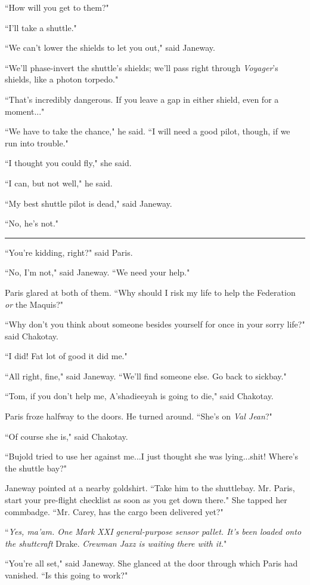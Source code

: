 \documentclass[twoside,letterpaper,12pt]{memoir}
\begin{document}
``How will you get to them?"

``I'll take a shuttle."

``We can't lower the shields to let you out," said Janeway.

``We'll phase-invert the shuttle's shields; we'll pass right through \textit{Voyager}'s shields, like a photon torpedo."

``That's incredibly dangerous. If you leave a gap in either shield, even for a moment..."

``We have to take the chance," he said. ``I will need a good pilot, though, if we run into trouble."

``I thought you could fly," she said.

``I can, but not well," he said.

``My best shuttle pilot is dead," said Janeway.

``No, he's not."

\fancybreak{\rule{3cm}{0.4 pt}}
``You're kidding, right?" said Paris.

``No, I'm not," said Janeway. ``We need your help."

Paris glared at both of them. ``Why should I risk my life to help the Federation \textit{or} the Maquis?"

``Why don't you think about someone besides yourself for once in your sorry life?" said Chakotay.

``I did! Fat lot of good it did me."

``All right, fine," said Janeway. ``We'll find someone else. Go back to sickbay."

``Tom, if you don't help me, A'shadieeyah is going to die," said Chakotay.

Paris froze halfway to the doors. He turned around. ``She's on \textit{Val Jean}?"

``Of course she is," said Chakotay.

``Bujold tried to use her against me...I just thought she was lying...shit! Where's the shuttle bay?"

Janeway pointed at a nearby goldshirt. ``Take him to the shuttlebay. Mr. Paris, start your pre-flight checklist as soon as you get down there." She tapped her commbadge. ``Mr. Carey, has the cargo been delivered yet?"

``\textit{Yes, ma'am. One Mark XXI general-purpose sensor pallet. It's been loaded onto the shuttcraft} Drake. \textit{Crewman Jaxz is waiting there with it.}"

``You're all set," said Janeway. She glanced at the door through which Paris had vanished. ``Is this going to work?"
\end{document}
